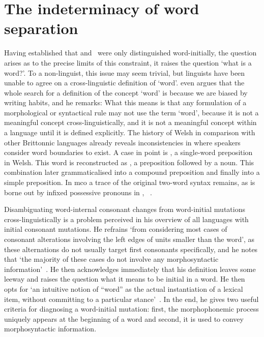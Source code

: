 \section{The indeterminacy of word separation}
\label{sec:indet-word-separ}
Having established that \lT and \xD\ were only distinguished word-initially, the question arises as to the precise limits of this constraint, \ie it raises the question `what is a word?'.
To a non-linguist, this issue may seem trivial, but linguists have been unable to agree on a cross-linguistic definition of `word'.
\Textcite[28]{haspelmath_indeterminacy_2011} even argues that the whole search for a definition of the concept `word' is because we are biased by writing habits, and he remarks: 
What this means is that any formulation of a morphological or syntactical rule may not use the term `word', because it is not a meaningful concept cross-linguistically, and it is not a meaningful concept within a language until it is defined explicitly. 
The history of Welsh in comparison with other Brittonnic languages already reveals inconsistencies in where speakers consider word boundaries  to exist.
A case in point is , a single-word preposition in Welsh.
This word is reconstructed as  \autocite[258]{schrijver_studies_1995}, a preposition followed by a noun.
This combination later grammaticalised into a compound preposition and finally into a simple preposition.
In \gls{mco} a trace of the original two-word syntax remains, as is borne out by infixed possessive pronouns in , \etc~\autocite[120]{koch_neo-brittonic_1989}.

Disambiguating word-internal consonant changes from word-initial mutations cross-linguistically is  a problem \textcite{iosad_right_2010} perceived in his overview of all languages with initial consonant mutations.
He refrains `from considering most cases of consonant alterations involving the left edges of units smaller than the word', as these alternations do not usually target first consonants specifically, and he notes that `the majority of these cases do not involve any morphosyntactic information'~\autocite[108]{iosad_right_2010}.
He then acknowledges immediately that his definition leaves some leeway and raises the question what it means to be initial in a word.
He then opts for `an intuitive notion of ``word'' as the actual instantiation of a lexical item, without committing to a particular stance'~\autocite[109]{iosad_right_2010}.
In the end, he gives two useful criteria for diagnosing a word-initial mutation: first, the morphophonemic process uniquely appears at the beginning of a word and second, it is used to convey morphosyntactic information.

